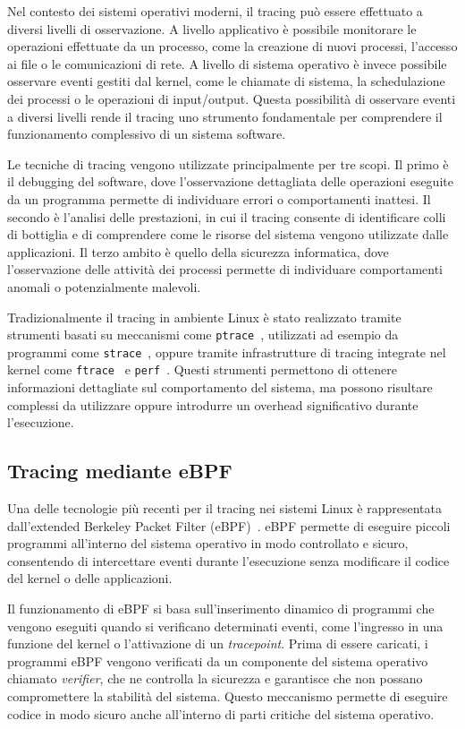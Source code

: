 Nel contesto dei sistemi operativi moderni, il tracing può essere effettuato a diversi livelli di osservazione. A livello applicativo è possibile monitorare le operazioni 
effettuate da un processo, come la creazione di nuovi processi, l’accesso ai file o le comunicazioni di rete. A livello di sistema operativo è invece possibile osservare 
eventi gestiti dal kernel, come le chiamate di sistema, la schedulazione dei processi o le operazioni di input/output. Questa possibilità di osservare eventi a diversi 
livelli rende il tracing uno strumento fondamentale per comprendere il funzionamento complessivo di un sistema software.

Le tecniche di tracing vengono utilizzate principalmente per tre scopi. Il primo è il debugging del software, dove l’osservazione dettagliata delle operazioni eseguite 
da un programma permette di individuare errori o comportamenti inattesi. Il secondo è l’analisi delle prestazioni, in cui il tracing consente di identificare colli di 
bottiglia e di comprendere come le risorse del sistema vengono utilizzate dalle applicazioni. Il terzo ambito è quello della sicurezza informatica, dove l’osservazione 
delle attività dei processi permette di individuare comportamenti anomali o potenzialmente malevoli.

Tradizionalmente il tracing in ambiente Linux è stato realizzato tramite strumenti basati su meccanismi come \texttt{ptrace}~\cite{ptrace_man}, utilizzati ad esempio da programmi come \texttt{strace}~\cite{strace_docs}, oppure 
tramite infrastrutture di tracing integrate nel kernel come \texttt{ftrace}~\cite{ftrace_docs} e \texttt{perf}~\cite{perf_docs}. Questi strumenti permettono di ottenere informazioni dettagliate sul comportamento del sistema, 
ma possono risultare complessi da utilizzare oppure introdurre un overhead significativo durante l’esecuzione.

\subsection{Tracing mediante eBPF}
Una delle tecnologie più recenti per il tracing nei sistemi Linux è rappresentata dall’extended Berkeley Packet Filter (eBPF)~\cite{ebpf_kernel}. eBPF permette di eseguire piccoli programmi 
all’interno del sistema operativo in modo controllato e sicuro, consentendo di intercettare eventi durante l’esecuzione senza modificare il codice del kernel o delle applicazioni.

Il funzionamento di eBPF si basa sull’inserimento dinamico di programmi che vengono eseguiti quando si verificano determinati eventi, come l’ingresso in una funzione del kernel o 
l’attivazione di un \textit{tracepoint}. Prima di essere caricati, i programmi eBPF vengono verificati da un componente del sistema operativo chiamato \textit{verifier}, che ne controlla la sicurezza 
e garantisce che non possano compromettere la stabilità del sistema. Questo meccanismo permette di eseguire codice in modo sicuro anche all’interno di parti critiche del sistema operativo.

